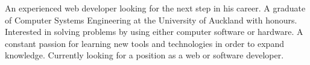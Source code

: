 

\begin{cvparagraph}

An experienced web developer looking for the next step in his career. A graduate of Computer Systems Engineering at the University of Auckland with honours. Interested in solving problems by using either computer software or hardware. A constant passion for learning new tools and technologies in order to expand knowledge. Currently looking for a position as a web or software developer.
\end{cvparagraph}
